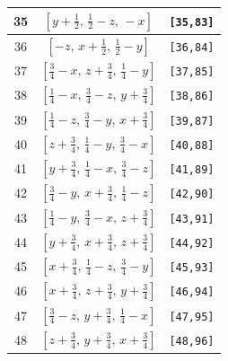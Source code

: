 \documentclass[fleqn,8pt]{jsarticle}
\begin{document}
\begin{longtable}{ccc}
35 & $\left[ y + \frac{1}{2},\, \frac{1}{2} - z,\, - x \right]$ & {\tt [35,83]} \\ \hline
36 & $\left[ - z,\, x + \frac{1}{2},\, \frac{1}{2} - y \right]$ & {\tt [36,84]} \\ \hline
37 & $\left[ \frac{3}{4} - x,\, z + \frac{3}{4},\, \frac{1}{4} - y \right]$ & {\tt [37,85]} \\ \hline
38 & $\left[ \frac{1}{4} - x,\, \frac{3}{4} - z,\, y + \frac{3}{4} \right]$ & {\tt [38,86]} \\ \hline
39 & $\left[ \frac{1}{4} - z,\, \frac{3}{4} - y,\, x + \frac{3}{4} \right]$ & {\tt [39,87]} \\ \hline
40 & $\left[ z + \frac{3}{4},\, \frac{1}{4} - y,\, \frac{3}{4} - x \right]$ & {\tt [40,88]} \\ \hline
41 & $\left[ y + \frac{3}{4},\, \frac{1}{4} - x,\, \frac{3}{4} - z \right]$ & {\tt [41,89]} \\ \hline
42 & $\left[ \frac{3}{4} - y,\, x + \frac{3}{4},\, \frac{1}{4} - z \right]$ & {\tt [42,90]} \\ \hline
43 & $\left[ \frac{1}{4} - y,\, \frac{3}{4} - x,\, z + \frac{3}{4} \right]$ & {\tt [43,91]} \\ \hline
44 & $\left[ y + \frac{3}{4},\, x + \frac{3}{4},\, z + \frac{3}{4} \right]$ & {\tt [44,92]} \\ \hline
45 & $\left[ x + \frac{3}{4},\, \frac{1}{4} - z,\, \frac{3}{4} - y \right]$ & {\tt [45,93]} \\ \hline
46 & $\left[ x + \frac{3}{4},\, z + \frac{3}{4},\, y + \frac{3}{4} \right]$ & {\tt [46,94]} \\ \hline
47 & $\left[ \frac{3}{4} - z,\, y + \frac{3}{4},\, \frac{1}{4} - x \right]$ & {\tt [47,95]} \\ \hline
48 & $\left[ z + \frac{3}{4},\, y + \frac{3}{4},\, x + \frac{3}{4} \right]$ & {\tt [48,96]} \\
\end{longtable}
\end{document}
